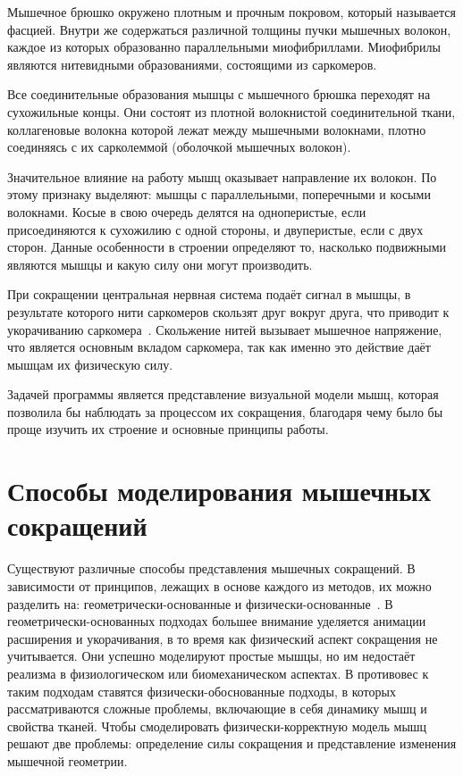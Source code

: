 \par Мышечное брюшко окружено плотным и прочным покровом, который называется фасцией. Внутри же содержаться различной толщины пучки мышечных волокон, каждое из которых образованно параллельными миофибриллами. Миофибрилы являются нитевидными образованиями, состоящими из саркомеров. 
\par Все соединительные образования мышцы с мышечного брюшка переходят на сухожильные концы. Они состоят из плотной волокнистой соединительной ткани, коллагеновые волокна которой лежат между мышечными волокнами, плотно соединяясь с их сарколеммой (оболочкой мышечных волокон).
\par Значительное влияние на работу мышц оказывает направление их волокон. По этому признаку выделяют: мышцы с параллельными, поперечными и косыми волокнами. Косые в свою очередь делятся на одноперистые, если присоединяются к сухожилию с одной стороны, и двуперистые, если с двух сторон. Данные особенности в строении определяют то, насколько подвижными являются мышцы и какую силу они могут производить.
\par При сокращении центральная нервная система подаёт сигнал в мышцы, в результате которого нити саркомеров скользят друг вокруг друга, что приводит к укорачиванию саркомера~\cite{muscle_03}. Скольжение нитей вызывает мышечное напряжение, что является основным вкладом саркомера, так как именно это действие даёт мышцам их физическую силу. 
\par Задачей программы является представление визуальной модели мышц, которая позволила бы наблюдать за процессом их сокращения, благодаря чему было бы проще изучить их строение и основные принципы работы.

\section{Способы моделирования мышечных сокращений}
\label{sec:muscle_meth}
Существуют различные способы представления мышечных сокращений. В зависимости от принципов, лежащих в основе каждого из методов, их можно разделить на: геометрически-основанные и физически-основанные~\cite{diff_methods}. В геометрически-основанных подходах большее внимание уделяется анимации расширения и укорачивания, в то время как физический аспект сокращения не учитывается. Они успешно моделируют простые мышцы, но им недостаёт реализма в физиологическом или биомеханическом аспектах. В противовес к таким подходам ставятся физически-обоснованные подходы, в которых рассматриваются сложные проблемы, включающие в себя динамику мышц и свойства тканей. Чтобы смоделировать физически-корректную модель мышц решают две проблемы: определение силы сокращения и представление изменения мышечной геометрии.

